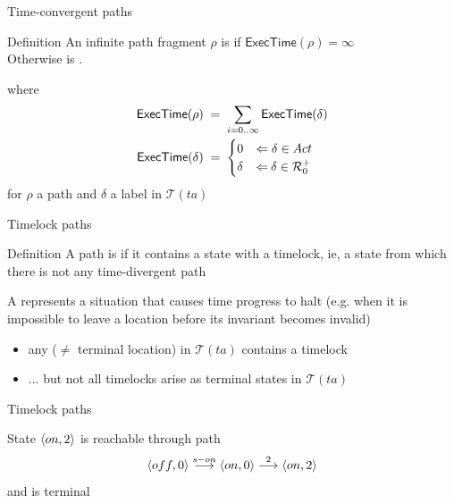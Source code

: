 \documentclass[aspectratio=169]{beamer}
\def\R{\mathcal{R}}
\def\TL#1{\mathcal{T}(#1)}
\def\ET#1{\mathsf{ExecTime(#1)}}
\begin{document}
\begin{slide}{Time-convergent paths}
\small

\begin{block}{Definition}
An infinite path fragment $\rho$ is  if $\ET{\rho} = \infty$\\
Otherwise is  . 
\end{block}

where
\begin{align*}
\ET{\rho}\; & =\; \sum_{i=0 .. \infty} \ET{\delta}\\
\ET{\delta}\; & =\; \begin{cases}
0 & \rimp\;  \delta \in Act\\
\delta & \rimp\:  \delta \in \R_0^+
\end{cases}
\end{align*}
for $\rho$ a path and $\delta$ a label in $\TL{ta}$ 
\end{slide}

\begin{slide}{Timelock paths}
\small

\begin{block}{Definition}
A path is  if it contains a state with a timelock, ie, a \alert{state
from which there is not any time-divergent path}
\vspace{0.3cm}

A  represents a situation that causes time progress to halt (e.g. when it is impossible to leave a location before its invariant becomes invalid)
\end{block}

\begin{itemize}
\item any  ($\neq$ terminal location) in $\TL{ta}$ contains a timelock
\item ... but not all timelocks arise as terminal states in $\TL{ta}$
\end{itemize}
\end{slide}



\begin{slide}{Timelock paths}
\small

\begin{center}
\end{center}

State $\mathopen{\langle}on,2\mathclose{\rangle}$ is reachable through path 
$$\mathopen{\langle}off,0\mathclose{\rangle} \stackrel{s-on}{\longrightarrow} \mathopen{\langle}on,0\mathclose{\rangle} \stackrel{2}{\longrightarrow} \mathopen{\langle}on,2\mathclose{\rangle}$$
and is terminal

\end{slide}
\end{document}
